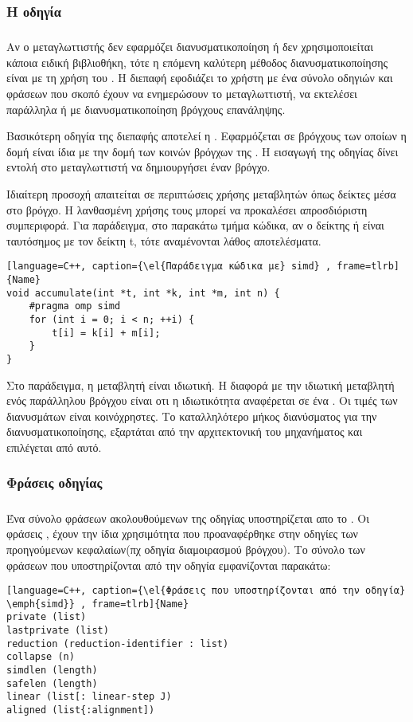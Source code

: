 \clearpage
\subsubsection{Η οδηγία \emph{}}
\subparagraph{}
Αν ο μεταγλωττιστής δεν εφαρμόζει διανυσματικοποίηση ή δεν χρησιμοποιείται κάποια ειδική βιβλιοθήκη, τότε η επόμενη
καλύτερη μέθοδος διανυσματικοποίησης είναι με τη χρήση του \emph{}. Η διεπαφή εφοδιάζει το χρήστη με ένα
σύνολο οδηγιών και φράσεων που σκοπό έχουν να ενημερώσουν το μεταγλωττιστή, να εκτελέσει παράλληλα ή με
διανυσματικοποίηση βρόγχους επανάληψης.

Βασικότερη οδηγία της διεπαφής αποτελεί η \textbf{\emph{}}. Εφαρμόζεται σε βρόγχους των οποίων η δομή είναι
ίδια με την δομή των κοινών βρόγχων της \emph{}. Η εισαγωγή της οδηγίας \emph{} δίνει εντολή στο
μεταγλωττιστή να δημιουργήσει έναν \emph{} βρόγχο.

Ιδιαίτερη προσοχή απαιτείται σε περιπτώσεις χρήσης  μεταβλητών όπως δείκτες μέσα στο βρόγχο. Η λανθασμένη χρήσης τους
μπορεί να προκαλέσει απροσδιόριστη συμπεριφορά. Για παράδειγμα, στο παρακάτω τμήμα κώδικα, αν ο δείκτης \emph{} ή
\emph{} είναι ταυτόσημος με τον δείκτη t, τότε αναμένονται λάθος αποτελέσματα. \ \\

\begin{lstlisting}[language=C++, caption={\el{Παράδειγμα κώδικα με} simd} , frame=tlrb]{Name}
void accumulate(int *t, int *k, int *m, int n) {
	#pragma omp simd
	for (int i = 0; i < n; ++i) {
		t[i] = k[i] + m[i];
	}
}
\end{lstlisting}


Στο παράδειγμα, η μεταβλητή \emph{} είναι ιδιωτική. Η διαφορά με την ιδιωτική μεταβλητή ενός παράλληλου βρόγχου
είναι οτι η ιδιωτικότητα αναφέρεται σε ένα \emph{}. Oι τιμές των διανυσμάτων \emph{} είναι
κοινόχρηστες. Το καταλληλότερο μήκος διανύσματος για την διανυσματικοποίησης, εξαρτάται από την αρχιτεκτονική του
μηχανήματος και επιλέγεται από αυτό. 
\subsubsection{Φράσεις οδηγίας \emph{}}
\subparagraph{}
Ένα σύνολο φράσεων ακολουθούμενων της οδηγίας \emph{} υποστηρίζεται απο το \emph{}. Οι φράσεις
\emph{}, έχουν την ίδια χρησιμότητα που προαναφέρθηκε στην
οδηγίες των προηγούμενων κεφαλαίων(πχ οδηγία διαμοιρασμού βρόγχου). Το σύνολο των φράσεων που υποστηρίζονται από την
οδηγία εμφανίζονται παρακάτω:
\begin{lstlisting}[language=C++, caption={\el{Φράσεις που υποστηρίζονται από την οδηγία} \emph{simd}} , frame=tlrb]{Name}
private (list)
lastprivate (list)
reduction (reduction-identifier : list)
collapse (n)
simdlen (length)
safelen (length)
linear (list[: linear-step J)
aligned (list{:alignment])
\end{lstlisting}
\clearpage
